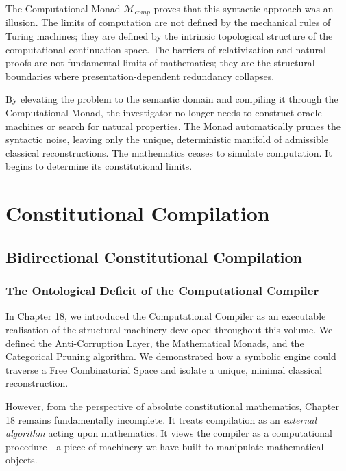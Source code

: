 \documentclass[12pt,openany]{extbook}
\theoremstyle{plain}
\theoremstyle{definition}
\begin{document}
The Computational Monad $\mathcal{M}_{comp}$ proves that this syntactic approach was an illusion. The limits of computation are not defined by the mechanical rules of Turing machines; they are defined by the intrinsic topological structure of the computational continuation space. The barriers of relativization and natural proofs are not fundamental limits of mathematics; they are the structural boundaries where presentation-dependent redundancy collapses.

By elevating the problem to the semantic domain and compiling it through the Computational Monad, the investigator no longer needs to construct oracle machines or search for natural properties. The Monad automatically prunes the syntactic noise, leaving only the unique, deterministic manifold of admissible classical reconstructions. The mathematics ceases to simulate computation. It begins to determine its constitutional limits.



\part{Constitutional Compilation}

\chapter{Bidirectional Constitutional Compilation}

\section{The Ontological Deficit of the Computational Compiler}

In Chapter 18, we introduced the Computational Compiler as an executable realisation of the structural machinery developed throughout this volume. We defined the Anti-Corruption Layer, the Mathematical Monads, and the Categorical Pruning algorithm. We demonstrated how a symbolic engine could traverse a Free Combinatorial Space and isolate a unique, minimal classical reconstruction.

However, from the perspective of absolute constitutional mathematics, Chapter 18 remains fundamentally incomplete. It treats compilation as an \emph{external algorithm} acting upon mathematics. It views the compiler as a computational procedure—a piece of machinery we have built to manipulate mathematical objects. 
\end{document}
